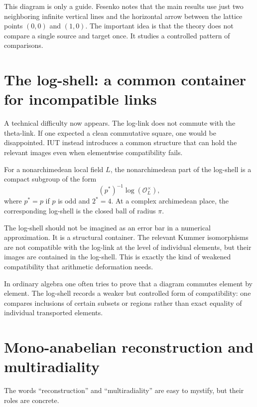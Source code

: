 This diagram is only a guide.  Fesenko notes that the main results use just two neighboring infinite vertical lines and the horizontal arrow between the lattice points \((0,0)\) and \((1,0)\).  The important idea is that the theory does not compare a single source and target once.  It studies a controlled pattern of comparisons.

\section{The log-shell: a common container for incompatible links}

A technical difficulty now appears.  The log-link does not commute with the theta-link.  If one expected a clean commutative square, one would be disappointed.  IUT instead introduces a common structure that can hold the relevant images even when elementwise compatibility fails.

\begin{definition}
For a nonarchimedean local field \(L\), the nonarchimedean part of the log-shell is a compact subgroup of the form
\[
  (p^{\ast})^{-1}\log(\mathcal O_L^{\times}),
\]
where \(p^{\ast}=p\) if \(p\) is odd and \(2^{\ast}=4\).  At a complex archimedean place, the corresponding log-shell is the closed ball of radius \(\pi\).
\end{definition}

The log-shell should not be imagined as an error bar in a numerical approximation.  It is a structural container.  The relevant Kummer isomorphisms are not compatible with the log-link at the level of individual elements, but their images are contained in the log-shell.  This is exactly the kind of weakened compatibility that arithmetic deformation needs.

\begin{remark}
In ordinary algebra one often tries to prove that a diagram commutes element by element.  The log-shell records a weaker but controlled form of compatibility: one compares inclusions of certain subsets or regions rather than exact equality of individual transported elements.
\end{remark}

\section{Mono-anabelian reconstruction and multiradiality}

The words ``reconstruction'' and ``multiradiality'' are easy to mystify, but their roles are concrete.

